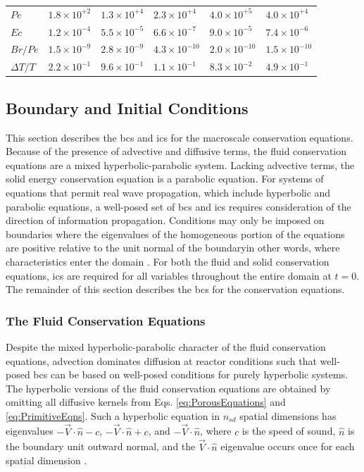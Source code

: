 \begin{table}[!h]
\begin{tabular}{|l |l l l l l|}
 \(Pe\)							& \(1.8\times10^{+2}\)	& \(1.3\times10^{+4}\)		& \(2.3\times10^{+4}\)		& \(4.0\times10^{+5}\)		& \(4.0\times10^{+4}\)\\
 \(Ec\) & \(1.2\times10^{-4}\) & \(5.5\times10^{-5}\) & \(6.6\times10^{-7}\) & \(9.0\times10^{-5}\) & \(7.4\times10^{-6}\)\\
 \(Br/Pe\)							& \(1.5\times10^{-9}\)& \(2.8\times10^{-9}\)	& \(4.3\times10^{-10}\)	& \(2.0\times10^{-10}\)	& \(1.5\times10^{-10}\)\\
 \(\Delta T/T\) & \(2.2\times10^{-1}\) & \(9.6\times10^{-1}\) & \(1.1\times10^{-1}\) & \(8.3\times10^{-2}\) & \(4.9\times10^{-1}\)\Bstrut\\
\hline
\end{tabular}
\label{table:TypicalData}
\end{table}

\subsection{Boundary and Initial Conditions}
\label{sec:BCs}

This section describes the \glspl{bc} and \glspl{ic} for the macroscale conservation equations. Because of the presence of advective and diffusive terms, the fluid conservation equations are a mixed hyperbolic-parabolic system. Lacking advective terms, the solid energy conservation equation is a parabolic equation. For systems of equations that permit real wave propagation, which include hyperbolic and parabolic equations, a well-posed set of \glspl{bc} and \glspl{ic} requires consideration of the direction of information propagation. Conditions may only be imposed on boundaries where the eigenvalues of the homogeneous portion of the equations are positive relative to the unit normal of the boundary\mdash  in other words, where characteristics enter the domain \cite{hirsch}. For both the fluid and solid conservation equations, \glspl{ic} are required for all variables throughout the entire domain at \(t=0\). The remainder of this section describes the \glspl{bc} for the conservation equations.

\subsubsection{The Fluid Conservation Equations}

Despite the mixed hyperbolic-parabolic character of the fluid conservation equations, advection dominates diffusion at reactor conditions such that well-posed \glspl{bc} can be based on well-posed conditions for purely hyperbolic systems. The hyperbolic versions of the fluid conservation equations are obtained by omitting all diffusive kernels from Eqs. \eqref{eq:PorousEquations} and \eqref{eq:PrimitiveEqns}. Such a hyperbolic equation in \(n_{sd}\) spatial dimensions has eigenvalues \(-\vec{V}\cdot\hat{n}-c\), \(-\vec{V}\cdot\hat{n}+c\), and \(-\vec{V}\cdot\hat{n}\), where \(c\) is the speed of sound, \(\hat{n}\) is the boundary unit outward normal, and the \(\vec{V}\cdot\hat{n}\) eigenvalue occurs once for each spatial dimension \cite{rohde}. 

